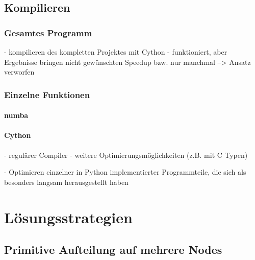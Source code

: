 \subsection{Kompilieren}

\subsubsection{Gesamtes Programm}

\begin{correctmore}
	- kompilieren des kompletten Projektes mit Cython
	- funktioniert, aber Ergebnisse bringen nicht gewünschten Speedup bzw. nur manchmal
	--> Ansatz verworfen
\end{correctmore}

\subsubsection{Einzelne Funktionen}


\paragraph{numba}


\paragraph{Cython}

\begin{correctmore}
	- regulärer Compiler
	- weitere Optimierungsmöglichkeiten (z.B. mit C Typen)
\end{correctmore}

\begin{correctmore}
	- Optimieren einzelner in Python implementierter Programmteile, die sich als besonders langsam herausgestellt haben
\end{correctmore}






\iffalse

\section{Lösungsstrategien}

\subsection{Primitive Aufteilung auf mehrere Nodes}

